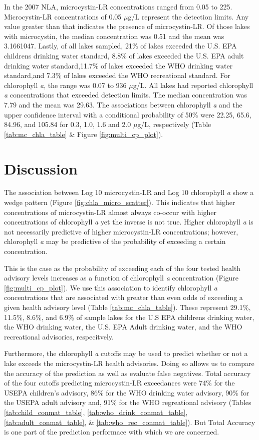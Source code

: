 \documentclass[11pt,]{article}
\begin{document}
In the 2007 NLA, microcystin-LR concentrations ranged from 0.05 to 225.
Microcystin-LR concentrations of 0.05 \(\mu\)g/L represent the detection
limits. Any value greater than that indicates the presence of
microcystin-LR. Of those lakes with microcystin, the median
concentration was 0.51 and the mean was 3.1661047. Lastly, of all lakes
sampled, 21\% of lakes exceeded the U.S. EPA childrens drinking water
standard, 8.8\% of lakes exceeded the U.S. EPA adult drinking water
standard,11.7\% of lakes exceeded the WHO drinking water standard,and
7.3\% of lakes exceeded the WHO recreational standard. For chlorophyll
\emph{a}, the range was 0.07 to 936 \(\mu\)g/L. All lakes had reported
chlorophyll \emph{a} concentrations that exceeded detection limits. The
median concentration was 7.79 and the mean was 29.63. The associations
between chlorophyll \emph{a} and the upper confidence interval with a
conditional probability of 50\% were 22.25, 65.6, 84.96, and 105.84 for
0.3, 1.0, 1.6 and 2.0 \(\mu\)g/L, respectively (Table
\ref{tab:mc_chla_table} \& Figure \ref{fig:multi_cp_plot}).

\section{Discussion}\label{discussion}

The association between Log 10 microcystin-LR and Log 10 chlorophyll
\emph{a} show a wedge pattern (Figure \ref{fig:chla_micro_scatter}).
This indicates that higher concentrations of microcystin-LR almost
always co-occur with higher concentrations of chlorophyll \emph{a} yet
the inverse is not true. Higher chlorophyll \emph{a} is not necessarily
predictive of higher microcystin-LR concentrations; however, chlorophyll
\emph{a} may be predictive of the probability of exceeding a certain
concentration.

This is the case as the probability of exceeding each of the four tested
health advisory levels increases as a function of chlorophyll \emph{a}
concentration (Figure \ref{fig:multi_cp_plot}). We use this association
to identify chlorophyll \emph{a} concentrations that are associated with
greater than even odds of exceeding a given health advisory level (Table
\ref{tab:mc_chla_table}). These represent 29.1\%, 11.5\%, 8.6\%, and
6.9\% of sample lakes for the U.S EPA childrens drinking water, the WHO
drinking water, the U.S. EPA Adult drinking water, and the WHO
recreational advisories, respecitvely.

Furthermore, the chlorophyll \emph{a} cutoffs may be used to predict
whether or not a lake exceeds the microcystin-LR health advisories.
Doing so allows us to compare the accuracy of the prediction as well as
evaluate false negatives. Total accuracy of the four cutoffs predicting
microcystin-LR exceedances were 74\% for the USEPA children's advisory,
86\% for the WHO drinking water advisory, 90\% for the USEPA adult
advisory and, 91\% for the WHO regreational advisory (Tables
\ref{tab:child_conmat_table}, \ref{tab:who_drink_conmat_table},
\ref{tab:adult_conmat_table}, \& \ref{tab:who_rec_conmat_table}). But
Total Accuracy is one part of the prediction performace with which we
are concerned.
\end{document}
